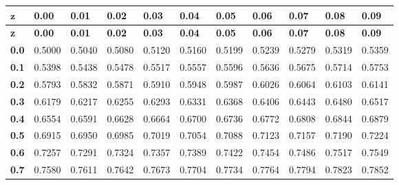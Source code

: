 \renewcommand{\arraystretch}{1.3}
\begin{longtable}{|l|l|l|l|l|l|l|l|l|l|l|}
    \hline
    \rowcolor{gray!30}
    $\mathbf{z}$    & \textbf{0.00}    & \textbf{0.01}    & \textbf{0.02}    & \textbf{0.03}    & \textbf{0.04}    & \textbf{0.05}    & \textbf{0.06}    & \textbf{0.07}    & \textbf{0.08}    & \textbf{0.09}\\
    \hline\endfirsthead

    \hline
    \rowcolor{gray!50}
    \textbf{z}    & \textbf{0.00}    & \textbf{0.01}    & \textbf{0.02}    & \textbf{0.03}    & \textbf{0.04}    & \textbf{0.05}    & \textbf{0.06}    & \textbf{0.07}    & \textbf{0.08}    & \textbf{0.09}\\
    \hline\endhead

    \hline\endfoot
    \hline\endlastfoot
    
    \textbf{0.0}  & 0.5000  & 0.5040  & 0.5080  & 0.5120  & 0.5160  & 0.5199  & 0.5239  & 0.5279  & 0.5319  & 0.5359\\ \hline
    
    \textbf{0.1}  & 0.5398  & 0.5438  & 0.5478  & 0.5517  & 0.5557  & 0.5596  & 0.5636  & 0.5675  & 0.5714  & 0.5753\\ \hline
    
    \textbf{0.2}  & 0.5793  & 0.5832  & 0.5871  & 0.5910  & 0.5948  & 0.5987  & 0.6026  & 0.6064  & 0.6103  & 0.6141\\ \hline
    
    \textbf{0.3}  & 0.6179  & 0.6217  & 0.6255  & 0.6293  & 0.6331  & 0.6368  & 0.6406  & 0.6443  & 0.6480  & 0.6517\\ \hline
    
    \textbf{0.4}  & 0.6554  & 0.6591  & 0.6628  & 0.6664  & 0.6700  & 0.6736  & 0.6772  & 0.6808  & 0.6844  & 0.6879\\ \hline
    
    \textbf{0.5}  & 0.6915  & 0.6950  & 0.6985  & 0.7019  & 0.7054  & 0.7088  & 0.7123  & 0.7157  & 0.7190  & 0.7224\\ \hline
    
    \textbf{0.6}  & 0.7257  & 0.7291  & 0.7324  & 0.7357  & 0.7389  & 0.7422  & 0.7454  & 0.7486  & 0.7517  & 0.7549\\ \hline
    
    \textbf{0.7}  & 0.7580  & 0.7611  & 0.7642  & 0.7673  & 0.7704  & 0.7734  & 0.7764  & 0.7794  & 0.7823  & 0.7852\\ \hline
    

\end{longtable}
